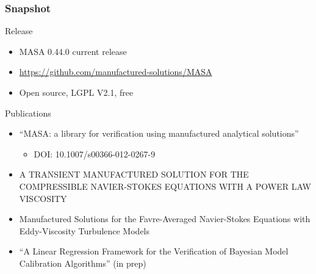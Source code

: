 \documentclass[mathserif]{beamer}
\begin{document}
\begin{frame}
  \frametitle{Snapshot}

  \begin{block}{Release}
    \begin{itemize} 
    \item MASA 0.44.0 current release
    \item \url{https://github.com/manufactured-solutions/MASA}
    \item Open source, LGPL V2.1, free
    \end{itemize}
  \end{block}

  \begin{block}{Publications}
   \begin{itemize}
    \item ``MASA: a library for verification using manufactured
	  analytical solutions''
    \begin{itemize}
     \item DOI: 10.1007/s00366-012-0267-9
    \end{itemize}
    \small
   \item A TRANSIENT MANUFACTURED SOLUTION FOR THE COMPRESSIBLE NAVIER-STOKES EQUATIONS WITH A POWER LAW VISCOSITY
   \item Manufactured Solutions for the Favre-Averaged Navier-Stokes Equations with Eddy-Viscosity Turbulence Models
   \item ``A Linear Regression Framework for the Verification of Bayesian Model Calibration Algorithms'' (in prep)

   \end{itemize}
  \end{block}

\end{frame}
\end{document}
